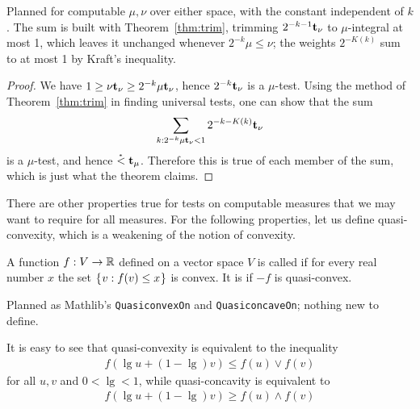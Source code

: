 \begin{formalization}
Planned for computable $\mu,\nu$ over either space, with the constant independent of $k$. The sum
is built with Theorem~\ref{thm:trim}, trimming $2^{-k-1}\mathbf{t}_{\nu}$ to $\mu$-integral at most 1,
which leaves it unchanged whenever $2^{-k}\mu\le\nu$; the weights $2^{-K(k)}$ sum to at most 1 by
Kraft's inequality.
\end{formalization}
 \begin{proof}
 We have \( 1\ge\nu\mathbf{t}_{\nu}\ge 2^{-k}\mu\mathbf{t}_{\nu} \),
 hence \( 2^{-k}\mathbf{t}_{\nu} \) is a \( \mu \)-test.
 Using the method of Theorem~\ref{thm:trim} in finding universal tests, 
 one can show that the sum
  \begin{align*}
    \sum_{k: 2^{-k}\mu\mathbf{t}_{\nu}<1} 2^{-k-K(k)}\mathbf{t}_{\nu}
  \end{align*}
 is a \( \mu \)-test, and hence \( \stackrel{{}_*}{<} \mathbf{t}_{\mu} \).
 Therefore this is true of each member of the sum, which is just what the theorem
 claims.
 \end{proof}

 There are other properties true for tests on computable measures that we may
 want to require for all measures.
 For the following properties, let us define quasi-convexity, which is a
 weakening of the notion of convexity.

 \begin{definition}\label{def:quasi-convex}
 A function \( f:V\to\mathbb{R} \) defined on a vector space \( V \) is called
  if for every real number \( x \) the set \( \mathopen\{\mskip 1mu v: f(v)\le x\mskip 1mu\mathclose\} \)
 is convex.
 It is   if \( -f \) is quasi-convex.
 \end{definition}

\begin{formalization}
Planned as Mathlib's \texttt{QuasiconvexOn} and \texttt{QuasiconcaveOn}; nothing new to define.
\end{formalization}

 It is easy to see that quasi-convexity is equivalent to the inequality
  \begin{align*}
  f(\lg u + (1-\lg)v)\le f(u)\lor f(v)
  \end{align*}
 for all \( u,v \) and \( 0<\lg<1 \), while quasi-concavity is equivalent to
  \begin{align*}
  f(\lg u + (1-\lg)v)\ge f(u)\land f(v)
  \end{align*}

